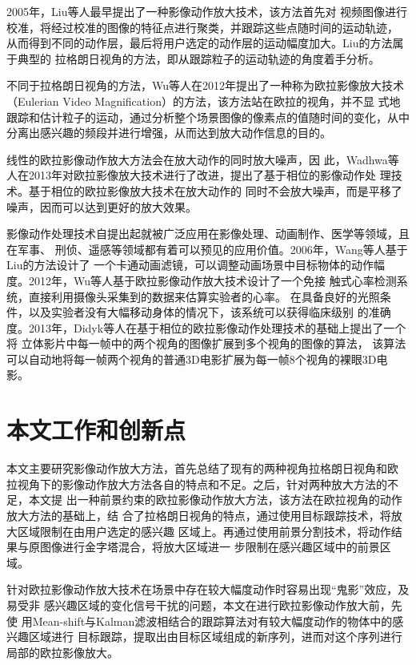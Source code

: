 2005年，Liu等人最早提出了一种影像动作放大技术，该方法首先对
视频图像进行校准，将经过校准的图像的特征点进行聚类，并跟踪这些点随时间的运动轨迹，
从而得到不同的动作层，最后将用户选定的动作层的运动幅度加大。Liu的方法属于典型的
拉格朗日视角的方法，即从跟踪粒子的运动轨迹的角度着手分析。

不同于拉格朗日视角的方法，Wu等人在2012年提出了一种称为欧拉影像放大技术（Eulerian
Video Magnification）的方法，该方法站在欧拉的视角，并不显
式地跟踪和估计粒子的运动，通过分析整个场景图像的像素点的值随时间的变化，从中
分离出感兴趣的频段并进行增强，从而达到放大动作信息的目的。

线性的欧拉影像动作放大方法会在放大动作的同时放大噪声，因
此，Wadhwa等人在2013年对欧拉影像放大技术进行了改进，提出了基于相位的影像动作处
理技术。基于相位的欧拉影像放大技术在放大动作的
同时不会放大噪声，而是平移了噪声，因而可以达到更好的放大效果。

影像动作处理技术自提出起就被广泛应用在影像处理、动画制作、医学等领域，且在军事、
刑侦、遥感等领域都有着可以预见的应用价值。2006年，Wang等人基于Liu的方法设计了
一个卡通动画滤镜，可以调整动画场景中目标物体的动作幅
度。2012年，Wu等人基于欧拉影像动作放大技术设计了一个免接
触式心率检测系统，直接利用摄像头采集到的数据来估算实验者的心率。
在具备良好的光照条件，以及实验者没有大幅移动身体的情况下，该系统可以获得临床级别
的准确度。2013年，Didyk等人在基于相位的欧拉影像动作处理技术的基础上提出了一个将
立体影片中每一帧中的两个视角的图像扩展到多个视角的图像的算法，
该算法可以自动地将每一帧两个视角的普通3D电影扩展为每一帧8个视角的裸眼3D电影。

\clearpage

\section{本文工作和创新点}
\label{sec:creation}

本文主要研究影像动作放大方法，首先总结了现有的两种视角\pozhehao 拉格朗日视角和欧
拉视角下的影像动作放大方法各自的特点和不足。之后，针对两种放大方法的不足，本文提
出一种前景约束的欧拉影像动作放大方法，该方法在欧拉视角的动作放大方法的基础上，结
合了拉格朗日视角的特点，通过使用目标跟踪技术，将放大区域限制在由用户选定的感兴趣
区域上。再通过使用前景分割技术，将动作结果与原图像进行金字塔混合，将放大区域进一
步限制在感兴趣区域中的前景区域。

针对欧拉影像动作放大技术在场景中存在较大幅度动作时容易出现“鬼影”效应，及易受非
感兴趣区域的变化信号干扰的问题，本文在进行欧拉影像动作放大前，先使
用Mean-shift与Kalman滤波相结合的跟踪算法对有较大幅度动作的物体中的感兴趣区域进行
目标跟踪，提取出由目标区域组成的新序列，进而对这个序列进行局部的欧拉影像放大。

